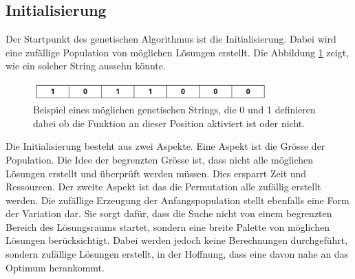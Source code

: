 %
%
%
%
\subsection{Initialisierung
\label{buch:paper:varalg:subsection:initialization}}
Der Startpunkt des genetischen Algorithmus ist die Initialisierung.
Dabei wird eine zufällige Population von möglichen Lösungen erstellt.
Die Abbildung \ref{fig:possible_genetic_string} zeigt, wie ein solcher 
String aussehn könnte.
\begin{figure}
	\centering
	\includegraphics[width=0.8\textwidth]{
        papers/varalg/images/teil3/01GeneticString.png
        }
	\caption{
		Beispiel eines möglichen genetischen Strings, die 0 und 1 definieren dabei
		ob die Funktion an dieser Position aktiviert ist oder nicht.
		}
	\label{fig:possible_genetic_string}
\end{figure}
Die Initialisierung besteht aus zwei Aspekte. Eine Aspekt ist die Grösse
der Population. Die Idee der begrenzten Grösse ist, dass nicht alle möglichen
Lösungen erstellt und überprüft werden müssen. Dies ersparrt Zeit und Ressourcen.
Der zweite Aspekt ist das die Permutation alle zufällig erstellt werden.
Die zufällige Erzeugung der Anfangspopulation stellt ebenfalls eine Form 
der Variation dar. Sie sorgt dafür, dass die Suche nicht von einem begrenzten 
Bereich des Lösungsraums startet, sondern eine breite Palette von möglichen 
Lösungen berücksichtigt. Dabei werden jedoch keine Berechnungen durchgeführt, 
sondern zufällige Lösungen erstellt, in der Hoffnung, dass eine davon nahe 
an das Optimum herankommt.

